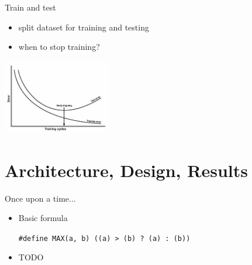 \documentclass{beamer}
\begin{document}
\begin{frame}{Train and test}
	\begin{itemize}
		\item split dataset for training and testing
		\item when to stop training?
	\end{itemize}
	 \includegraphics[width=180px,height=123px]{img/traintest.jpg}
\end{frame}

\section{Architecture, Design, Results}
\begin{frame}{Once upon a time...}
	\begin{itemize}
		\item Basic formula
			\begin{beamerboxesrounded}[lower=block body,shadow=true]{}
				\texttt{\#define MAX(a, b)   ((a) > (b) ? (a) : (b))}
			\end{beamerboxesrounded}
		\item TODO
	\end{itemize}
\end{frame}
\end{document}
